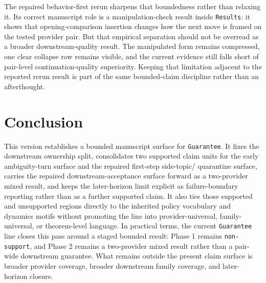 \documentclass[11pt]{article}
\begin{document}
The repaired behavior-first rerun sharpens that boundedness rather than
relaxing it. Its correct manuscript role is a manipulation-check result inside
\texttt{Results}: it shows that opening-comparison insertion changes how the
next move is framed on the tested provider pair. But that empirical separation
should not be overread as a broader downstream-quality result. The manipulated
form remains compressed, one clear collapse row remains visible, and the
current evidence still falls short of pair-level continuation-quality
superiority. Keeping that limitation adjacent to the reported rerun result is
part of the same bounded-claim discipline rather than an afterthought.

\section{Conclusion}

This version establishes a bounded manuscript surface for \texttt{Guarantee}.
It fixes the downstream ownership split, consolidates two supported claim units
for the early ambiguity-turn surface and the repaired first-step side-topic/
quarantine surface, carries the repaired downstream-acceptance surface forward
as a two-provider mixed result, and keeps the later-horizon limit explicit as
failure-boundary reporting rather than as a further supported claim. It also
ties those supported and unsupported regions directly to the inherited policy
vocabulary and dynamics motifs without promoting the line into
provider-universal, family-universal, or theorem-level language. In practical
terms, the current \texttt{Guarantee} line closes this pass around a staged
bounded result: Phase 1 remains \texttt{non-support}, and Phase 2 remains a
two-provider mixed result rather than a pair-wide downstream guarantee. What
remains outside the present claim surface is broader provider coverage, broader
downstream family coverage, and later-horizon closure.
\end{document}
